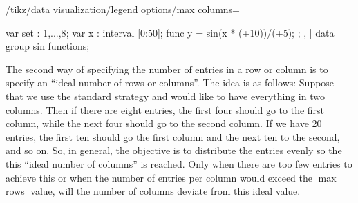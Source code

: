\begin{key}{/tikz/data visualization/legend options/max columns=}
\begin{codeexample}
{{{    var set : {1,...,8};
    var x : interval [0:50];
    func y = sin(\value x * (\value{set}+10))/(\value{set}+5);
  }
};%
},
]
\tikz \datavisualization [
  visualize as smooth line/.list={1,2,3,4,5,6,7,8},
  legend example, style sheet=vary hue,
  main legend={right then down,max columns=4}]
data group {sin functions};
\end{codeexample}
\end{key}

The second way of specifying the number of entries in a row or column is to
specify an ``ideal number of rows or columns''. The idea is as follows: Suppose
that we use the standard strategy and would like to have everything in two
columns. Then if there are eight entries, the first four should go to the first
column, while the next four should go to the second column. If we have 20
entries, the first ten should go the first column and the next ten to the
second, and so on. So, in general, the objective is to distribute the entries
evenly so the this ``ideal number of columns'' is reached. Only when there are
too few entries to achieve this or when the number of entries per column would
exceed the |max rows| value, will the number of columns deviate from this ideal
value.

